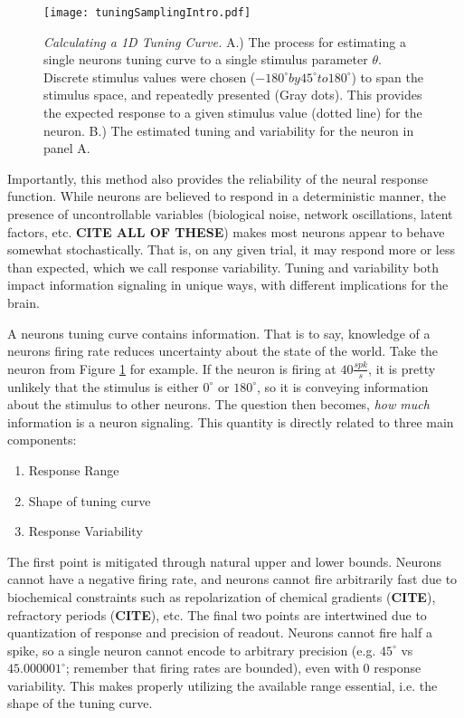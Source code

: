 \begin{figure}[h]
	\centerline{\texttt{[image: tuningSamplingIntro.pdf]}}
	\caption{\textit{Calculating a 1D Tuning Curve.} A.) The process for estimating a single neurons tuning curve to a single stimulus parameter $\theta$. Discrete stimulus values were chosen ($-180^\circ by 45^\circ to 180^\circ$) to span the stimulus space, and repeatedly presented (Gray dots). This provides the expected response to a given stimulus value (dotted line) for the neuron. B.) The estimated tuning and variability for the neuron in panel A.}
	\label{fig:tuningIntro}
\end{figure}

Importantly, this method also provides the reliability of the neural response function. While neurons are believed to respond in a deterministic manner, the presence of uncontrollable variables (biological noise, network oscillations, latent factors, etc. \textbf{CITE ALL OF THESE}) makes most neurons appear to behave somewhat stochastically. That is, on any given trial, it may respond more or less than expected, which we call response variability. Tuning and variability both impact information signaling in unique ways, with different implications for the brain. 

A neurons tuning curve contains information. That is to say, knowledge of a neurons firing rate reduces uncertainty about the state of the world. Take the neuron from Figure \ref{fig:tuningIntro} for example. If the neuron is firing at $40\frac{spk}{s}$, it is pretty unlikely that the stimulus is either $0^\circ$ or $180^\circ$, so it is conveying information about the stimulus to other neurons. The question then becomes, \textit{how much} information is a neuron signaling. This quantity is directly related to three main components:

\begin{enumerate}
	\item Response Range
	\item Shape of tuning curve
	\item Response Variability
\end{enumerate}

The first point is mitigated through natural upper and lower bounds. Neurons cannot have a negative firing rate, and neurons cannot fire arbitrarily fast due to biochemical constraints such as repolarization of chemical gradients (\textbf{CITE}), refractory periods (\textbf{CITE}), etc. The final two points are intertwined due to quantization of response and precision of readout. Neurons cannot fire half a spike, so a single neuron cannot encode to arbitrary precision (e.g. $45^\circ$ vs $45.000001^\circ$; remember that firing rates are bounded), even with 0 response variability. This makes properly utilizing the available range essential, i.e. the shape of the tuning curve.

